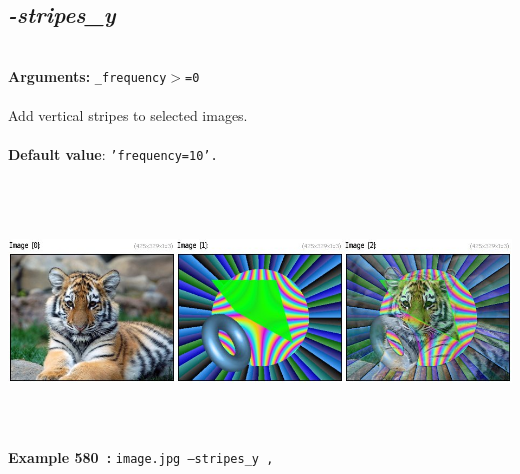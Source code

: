 \documentclass[a4paper,11pt,twoside]{book}
\begin{document}
\subsection{\emph{-stripes\_y} }\vspace*{-0.5em}
~\\\textbf{Arguments: } 
{\small \texttt{\_frequency$>$=0}}\\~\\
Add vertical stripes to selected images.
~\\~\\\textbf{Default value}: {\small \texttt{'frequency=10'.}}
\begin{center}\includegraphics[keepaspectratio=true,height=7cm,width=\textwidth]{img/gmic_def580.jpg}\\
{\footnotesize \textbf{Example 580~:} \texttt{image.jpg --stripes\_y ,}}
\end{center}
\end{document}
